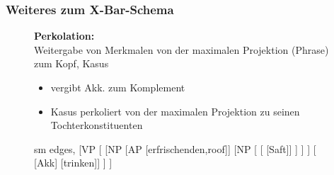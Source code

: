 \begin{frame}
\frametitle{Weiteres zum X-Bar-Schema}

\begin{figure}[b]

  	\begin{minipage}[b]{0.45\textwidth}
	\textbf{Perkolation:}\\
	 Weitergabe von Merkmalen von der maximalen Projektion (Phrase) zum Kopf, \zB Kasus
	 \begin{itemize}
	 	\item {} vergibt Akk. zum Komplement
	 	\item Kasus perkoliert von der maximalen Projektion zu seinen Tochterkonstituenten
	 \end{itemize}
  	\end{minipage}  
	\begin{minipage}[b]{0.45\textwidth}
	\centering
	\footnotesize{
		\begin{forest}
		sm edges,
		[VP 
			[ 
				[NP 
					[AP [erfrischenden,roof]]
					[NP
						[ 
							[ [Saft]]
						]
					]
				]
				[\alert{} \\\alert{{[}Akk{]}} [trinken]]
			]
		]
		\end{forest}
		}
  	\end{minipage}  
\end{figure}

\end{frame}


